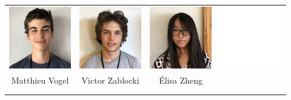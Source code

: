 \begin{center}
\begin{tabular}{cccc}
\includegraphics[angle=270,origin=c, width=27mm]{eleves/Vogel Matthieu.JPG} &
\includegraphics[angle=270,origin=c, width=27mm]{eleves/Zablocki Victor.JPG} &
\includegraphics[angle=270,origin=c, width=27mm]{eleves/Zheng Elisa.JPG} &
\includegraphics[angle=270,origin=c, width=27mm]{vide.JPG} \\
Matthieu Vogel & Victor Zablocki & Élisa Zheng & \\ \\ \\

\end{tabular}
\end{center}
